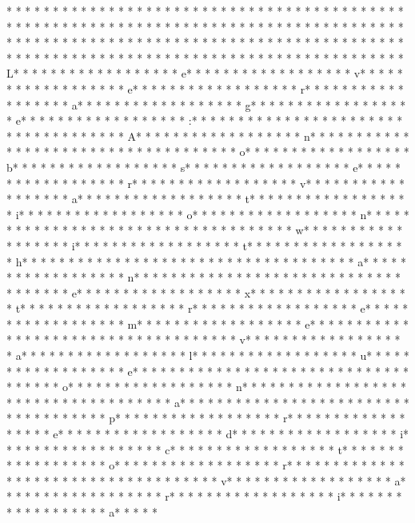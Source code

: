 * * *  * * *  * * *  *  * * *  *  * * *  * * *  * * *  *  * * *  *  * * *  * * *  * * *  *  * * *  *  * * *  *  * * *  * * *  * * *  *  * * *  *  * * *  *  * * *  * * *  * * *  *  * * *  *  * * *  *  * * *  * * *  * * *  *  * * *  *  * * *  *  * * *  * * *  * * *  *  * * *  *  * * *  *  * * *  * * *  * * *  *  * * *  *  * * *  *  * * *  * * *  * * *  *  * * *  *  * * *  *  * * *  * * *  * * *  *  * * *  *  * * *  * L* * *  * * *  * * *  *  * * *  *  * * *  * e* * *  * * *  * * *  *  * * *  *  * * *  * v* * *  * * *  * * *  *  * * *  *  * * *  * e* * *  * * *  * * *  *  * * *  *  * * *  * r* * *  * * *  * * *  *  * * *  *  * * *  * a* * *  * * *  * * *  *  * * *  *  * * *  * g* * *  * * *  * * *  *  * * *  *  * * *  * e* * *  * * *  * * *  *  * * *  *  * * *  * :* * *  * * *  * * *  *  * * *  *  * * *  *  * * *  * * *  * * *  *  * * *  *  * * *  * A* * *  * * *  * * *  *  * * *  *  * * *  * n* * *  * * *  * * *  *  * * *  *  * * *  *  * * *  * * *  * * *  *  * * *  *  * * *  * o* * *  * * *  * * *  *  * * *  *  * * *  * b* * *  * * *  * * *  *  * * *  *  * * *  * s* * *  * * *  * * *  *  * * *  *  * * *  * e* * *  * * *  * * *  *  * * *  *  * * *  * r* * *  * * *  * * *  *  * * *  *  * * *  * v* * *  * * *  * * *  *  * * *  *  * * *  * a* * *  * * *  * * *  *  * * *  *  * * *  * t* * *  * * *  * * *  *  * * *  *  * * *  * i* * *  * * *  * * *  *  * * *  *  * * *  * o* * *  * * *  * * *  *  * * *  *  * * *  * n* * *  * * *  * * *  *  * * *  *  * * *  *  * * *  * * *  * * *  *  * * *  *  * * *  * w* * *  * * *  * * *  *  * * *  *  * * *  * i* * *  * * *  * * *  *  * * *  *  * * *  * t* * *  * * *  * * *  *  * * *  *  * * *  * h* * *  * * *  * * *  *  * * *  *  * * *  *  * * *  * * *  * * *  *  * * *  *  * * *  * a* * *  * * *  * * *  *  * * *  *  * * *  * n* * *  * * *  * * *  *  * * *  *  * * *  *  * * *  * * *  * * *  *  * * *  *  * * *  * e* * *  * * *  * * *  *  * * *  *  * * *  * x* * *  * * *  * * *  *  * * *  *  * * *  * t* * *  * * *  * * *  *  * * *  *  * * *  * r* * *  * * *  * * *  *  * * *  *  * * *  * e* * *  * * *  * * *  *  * * *  *  * * *  * m* * *  * * *  * * *  *  * * *  *  * * *  * e* * *  * * *  * * *  *  * * *  *  * * *  *  * * *  * * *  * * *  *  * * *  *  * * *  * v* * *  * * *  * * *  *  * * *  *  * * *  * a* * *  * * *  * * *  *  * * *  *  * * *  * l* * *  * * *  * * *  *  * * *  *  * * *  * u* * *  * * *  * * *  *  * * *  *  * * *  * e* * *  * * *  * * *  *  * * *  *  * * *  *  * * *  * * *  * * *  *  * * *  *  * * *  * o* * *  * * *  * * *  *  * * *  *  * * *  * n* * *  * * *  * * *  *  * * *  *  * * *  *  * * *  * * *  * * *  *  * * *  *  * * *  * a* * *  * * *  * * *  *  * * *  *  * * *  *  * * *  * * *  * * *  *  * * *  *  * * *  * p* * *  * * *  * * *  *  * * *  *  * * *  * r* * *  * * *  * * *  *  * * *  *  * * *  * e* * *  * * *  * * *  *  * * *  *  * * *  * d* * *  * * *  * * *  *  * * *  *  * * *  * i* * *  * * *  * * *  *  * * *  *  * * *  * c* * *  * * *  * * *  *  * * *  *  * * *  * t* * *  * * *  * * *  *  * * *  *  * * *  * o* * *  * * *  * * *  *  * * *  *  * * *  * r* * *  * * *  * * *  *  * * *  *  * * *  *  * * *  * * *  * * *  *  * * *  *  * * *  * v* * *  * * *  * * *  *  * * *  *  * * *  * a* * *  * * *  * * *  *  * * *  *  * * *  * r* * *  * * *  * * *  *  * * *  *  * * *  * i* * *  * * *  * * *  *  * * *  *  * * *  * a* * *  * * 